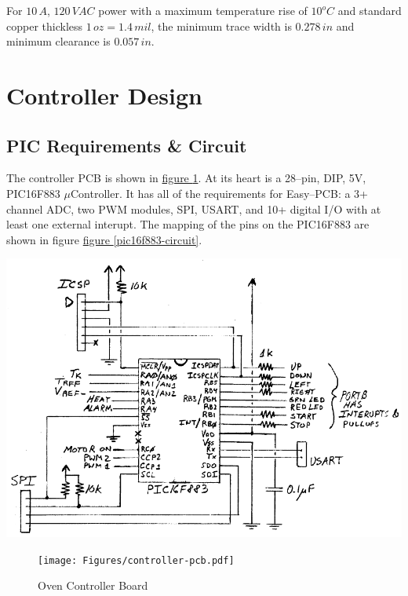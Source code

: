 \documentclass[10pt, twocolumn]{article}
\begin{document}
For $10\,A$, $120\,VAC$ power with a maximum temperature rise of $10^{o}C$
and standard copper thickless $1\,oz=1.4\,mil$, the minimum trace width
is $0.278\,in$ and minimum clearance is $0.057\,in$.

\section{Controller Design}
\label{controller-section}

\subsection{PIC Requirements \& Circuit}

The controller PCB is shown in
\hyperref[controller-pcb]{figure \ref{controller-pcb}}.
At its heart is a 28--pin, DIP, 5V, \textrm{PIC16F883} $\mu$Controller.
It has all of the requirements for  \textrm{Easy--PCB}:
a 3+ channel ADC, two PWM modules, SPI, USART, and 10+
digital I/O with at least one external interupt.
The mapping of the pins on the \textrm{PIC16F883} are shown in figure
\hyperref[pic16f883-circuit]{figure \ref{pic16f883-circuit}}.

\begin{center}
	\includegraphics[width=\columnwidth]{Figures/pic16f883-circuit.pdf}
	\label{pic16f883-circuit}
\end{center}

\begin{figure}
	\centering
	\texttt{[image: Figures/controller-pcb.pdf]}
	\caption{Oven Controller Board}
	\label{controller-pcb}
\end{figure}
\end{document}
